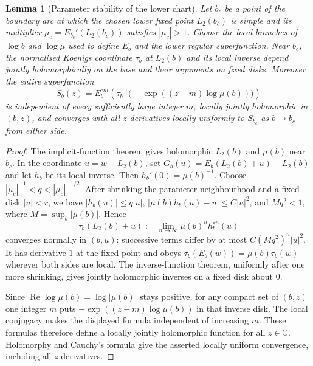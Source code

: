 \documentclass[11pt]{amsart}
\newtheorem{lemma}[theorem]{Lemma}
\theoremstyle{definition}
\begin{document}
\begin{lemma}[Parameter stability of the lower chart]
\label{lem:lower-chart}
Let $b_c$ be a point of the boundary arc at which the chosen lower fixed
point $L_2(b_c)$ is simple and its multiplier
$\mu_c=E_{b_c}'(L_2(b_c))$ satisfies $|\mu_c|>1$.  Choose the local
branches of $\log b$ and $\log\mu$ used to define $E_b$ and the lower
regular superfunction.  Near $b_c$, the normalised Koenigs coordinate
$\tau_b$ at $L_2(b)$ and its local inverse depend jointly holomorphically
on the base and their arguments on fixed disks.  Moreover the entire
superfunction
\[
 S_b(z)=E_b^{\circ m}\!\left(\tau_b^{-1}
          \bigl(-\exp((z-m)\log\mu(b))\bigr)\right)
\]
is independent of every sufficiently large integer $m$, locally jointly
holomorphic in $(b,z)$, and converges with all $z$-derivatives locally
uniformly to $S_{b_c}$ as $b\to b_c$ from either side.
\end{lemma}

\begin{proof}
The implicit-function theorem gives holomorphic $L_2(b)$ and $\mu(b)$
near $b_c$.  In the coordinate $u=w-L_2(b)$, set
$G_b(u)=E_b(L_2(b)+u)-L_2(b)$ and let $h_b$ be its local inverse.
Then $h_b'(0)=\mu(b)^{-1}$.  Choose
$|\mu_c|^{-1}<q<|\mu_c|^{-1/2}$.  After shrinking the parameter
neighbourhood and a fixed disk $|u|<r$, we have
$|h_b(u)|\le q|u|$, $|\mu(b)h_b(u)-u|\le C|u|^2$, and
$M q^2<1$, where $M=\sup_b|\mu(b)|$.  Hence
\[
 \tau_b(L_2(b)+u):=\lim_{n\to\infty}\mu(b)^n h_b^{\circ n}(u)
\]
converges normally in $(b,u)$: successive terms differ by at most
$C(Mq^2)^n|u|^2$.  It has derivative $1$ at the fixed point and obeys
$\tau_b(E_b(w))=\mu(b)\tau_b(w)$ wherever both sides are local.
The inverse-function theorem, uniformly after one more shrinking, gives
jointly holomorphic inverses on a fixed disk about $0$.

Since $\operatorname{Re}\log\mu(b)=\log|\mu(b)|$ stays positive, for any
compact set of $(b,z)$ one integer $m$ puts
$-\exp((z-m)\log\mu(b))$ in that inverse disk.  The local conjugacy
makes the displayed formula independent of increasing $m$.  These
formulas therefore define a locally jointly holomorphic function for all
$z\in\mathbb C$.  Holomorphy and Cauchy's formula give the asserted
locally uniform convergence, including all $z$-derivatives.
\end{proof}
\end{document}
